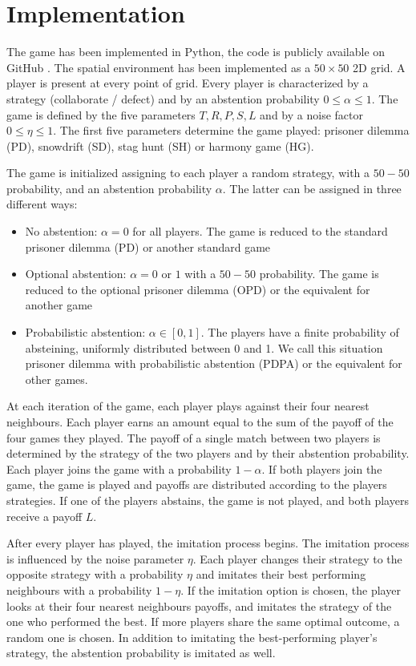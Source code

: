 \documentclass[12pt,oneside,a4paper,fleqn]{article}
\begin{document}
\section{Implementation}
The game has been implemented in Python, the code is publicly available on GitHub \cite{montalti2023}. The spatial environment has been implemented as a $50 \times 50$ 2D grid. A player is present at every point of grid. Every player is characterized by a strategy (collaborate / defect) and by an abstention probability $0 \leq \alpha \leq 1$. The game is defined by the five parameters $T, R,  P, S, L$ and by a noise factor $0 \leq \eta \leq 1$. The first five parameters determine the game played: prisoner dilemma (PD), snowdrift (SD), stag hunt (SH) or harmony game (HG).

The game is initialized assigning to each player a random strategy, with a $50-50$ probability, and an abstention probability $\alpha$. The latter can be assigned in three different ways:
\begin{itemize}
    \item No abstention: $\alpha = 0$ for all players. The game is reduced to the standard prisoner dilemma (PD) or another standard game
    \item Optional abstention: $\alpha = 0$ or $1$ with a $50-50$ probability. The game is reduced to the optional prisoner dilemma (OPD) or the equivalent for another game
    \item Probabilistic abstention: $\alpha \in [0,1]$. The players have a finite probability of absteining, uniformly distributed between 0 and 1. We call this situation prisoner dilemma with probabilistic abstention (PDPA) or the equivalent for other games.
\end{itemize}

At each iteration of the game, each player plays against their four nearest neighbours. Each player earns an amount equal to the sum of the payoff of the four games they played. The payoff of a single match between two players is determined by the strategy of the two players and by their abstention probability. Each player joins the game with a probability $1-\alpha$. If both players join the game, the game is played and payoffs are distributed according to the players strategies. If one of the players abstains, the game is not played, and both players receive a payoff $L$.

After every player has played, the imitation process begins. The imitation process is influenced by the noise parameter $\eta$. Each player changes their strategy to the opposite strategy with a probability $\eta$ and imitates their best performing neighbours with a probability $1-\eta$. If the imitation option is chosen, the player looks at their four nearest neighbours payoffs, and imitates the strategy of the one who performed the best. If more players share the same optimal outcome, a random one is chosen. In addition to imitating the best-performing player's strategy, the abstention probability is imitated as well.
\end{document}
